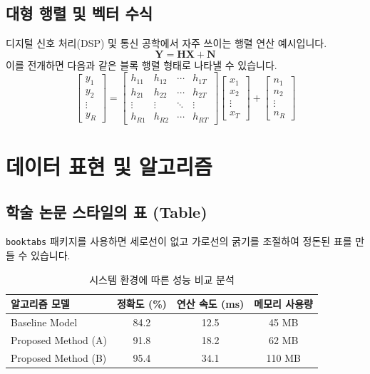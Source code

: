 \documentclass[11pt,a4paper,oneside]{memoir}
\begin{document}
\section{대형 행렬 및 벡터 수식}
디지털 신호 처리(DSP) 및 통신 공학에서 자주 쓰이는 행렬 연산 예시입니다.
\begin{equation}
    \mathbf{Y} = \mathbf{H}\mathbf{X} + \mathbf{N}
\end{equation}
이를 전개하면 다음과 같은 블록 행렬 형태로 나타낼 수 있습니다.
\begin{equation}
    \begin{bmatrix} y_1 \\ y_2 \\ \vdots \\ y_R \end{bmatrix} = 
    \begin{bmatrix}
        h_{11} & h_{12} & \cdots & h_{1T} \\
        h_{21} & h_{22} & \cdots & h_{2T} \\
        \vdots & \vdots & \ddots & \vdots \\
        h_{R1} & h_{R2} & \cdots & h_{RT}
    \end{bmatrix}
    \begin{bmatrix} x_1 \\ x_2 \\ \vdots \\ x_T \end{bmatrix} +
    \begin{bmatrix} n_1 \\ n_2 \\ \vdots \\ n_R \end{bmatrix}
\end{equation}


\chapter{데이터 표현 및 알고리즘}

\section{학술 논문 스타일의 표 (Table)}
\texttt{booktabs} 패키지를 사용하면 세로선이 없고 가로선의 굵기를 조절하여 정돈된 표를 만들 수 있습니다.

\begin{table}[htbp]
\centering
\caption{시스템 환경에 따른 성능 비교 분석}
\label{tab:performance}
\begin{tabular}{lccc}
    \toprule
    \textbf{알고리즘 모델} & \textbf{정확도 (\%)} & \textbf{연산 속도 (ms)} & \textbf{메모리 사용량} \\
    \midrule
    Baseline Model       & 84.2  & 12.5 & 45 MB \\
    Proposed Method (A)  & 91.8  & 18.2 & 62 MB \\
    Proposed Method (B)  & 95.4  & 34.1 & 110 MB \\
    \bottomrule
\end{tabular}
\end{table}
\end{document}
